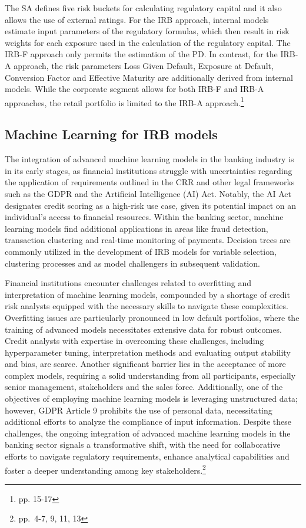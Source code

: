 The \acl{SA} defines five risk buckets for calculating regulatory capital and it also allows the use of external ratings. For the \ac{IRB} approach, internal models estimate input parameters of the regulatory formulas, which then result in risk weights for each exposure used in the calculation of the regulatory capital. The IRB-F approach only permits the estimation of the PD. In contrast, for the IRB-A approach, the risk parameters Loss Given Default, Exposure at Default, Conversion Factor and Effective Maturity are additionally derived from internal models. While the corporate segment allows for both IRB-F and IRB-A approaches, the retail portfolio is limited to the IRB-A approach.\footnote{\cite{Witzany:2017} pp. 15-17}

\subsection{Machine Learning for IRB models}
The integration of advanced machine learning models in the banking industry is in its early stages, as financial institutions struggle with uncertainties regarding the application of requirements outlined in the \acl{CRR} and other legal frameworks such as the \ac{GDPR} and the Artificial Intelligence (AI) Act. Notably, the AI Act designates credit scoring as a high-risk use case, given its potential impact on an individual's access to financial resources. Within the banking sector, machine learning models find additional applications in areas like fraud detection, transaction clustering and real-time monitoring of payments. Decision trees are commonly utilized in the development of \ac{IRB} models for variable selection, clustering processes and as model challengers in subsequent validation. 

Financial institutions encounter challenges related to overfitting and interpretation of machine learning models, compounded by a shortage of credit risk analysts equipped with the necessary skills to navigate these complexities. Overfitting issues are particularly pronounced in low default portfolios, where the training of advanced models necessitates extensive data for robust outcomes. Credit analysts with expertise in overcoming these challenges, including hyperparameter tuning, interpretation methods and evaluating output stability and bias, are scarce. Another significant barrier lies in the acceptance of more complex models, requiring a solid understanding from all participants, especially senior management, stakeholders and the sales force. Additionally, one of the objectives of employing machine learning models is leveraging unstructured data; however, \ac{GDPR} Article 9 prohibits the use of personal data, necessitating additional efforts to analyze the compliance of input information. Despite these challenges, the ongoing integration of advanced machine learning models in the banking sector signals a transformative shift, with the need for collaborative efforts to navigate regulatory requirements, enhance analytical capabilities and foster a deeper understanding among key stakeholders.\footnote{\cite{EBA:2023} pp.~4-7, 9, 11, 13}